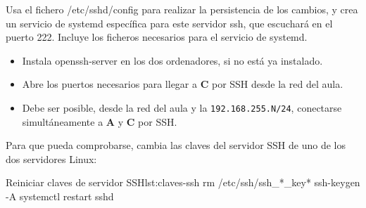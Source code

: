 \begin{homeworkProblem}

          {\vspace{-1cm}\noindent\fontsize{.1}{.1}\selectfont Usa el fichero /etc/sshd/config para realizar la persistencia de los cambios, y crea un servicio de systemd específica para este servidor ssh, que escuchará en el puerto 222. Incluye los ficheros necesarios para el servicio de systemd.\vspace{-.5cm}}
  
  \begin{itemize}
  \item Instala openssh-server en los dos ordenadores, si no está ya instalado.
  \item Abre los puertos necesarios para llegar a \textbf{C} por SSH desde la red del aula.
    
  \item Debe ser posible, desde la red del aula y la \texttt{192.168.255.N/24}, conectarse simultáneamente a \textbf{A} y \textbf{C} por SSH.
  \end{itemize}

  Para que pueda comprobarse, cambia las claves del servidor SSH de uno de los dos servidores Linux:

  \begin{listadoshell}{Reiniciar claves de servidor SSH}{lst:claves-ssh}
  rm /etc/ssh/ssh_*_key*
  ssh-keygen -A
  systemctl restart sshd
  \end{listadoshell}


  
\end{homeworkProblem}

